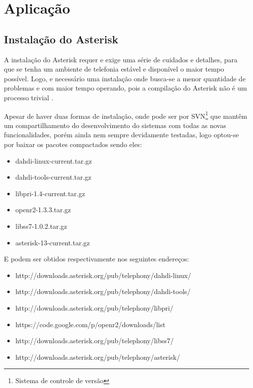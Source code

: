 
\chapter{Aplicação} %
\section{Instalação do Asterisk}
A instalação do Asterisk requer e exige uma série de cuidados e detalhes,  para que se tenha um ambiente de telefonia estável e disponível o maior tempo possível. Logo, e necessário uma instalação onde busca-se a menor quantidade de problemas e com maior tempo operando, pois a compilação do Asterisk não é um processo trivial \cite{alexandrekeller2014}.

Apesar de haver duas formas de instalação, onde pode ser por SVN\footnote{Sistema de controle de versão} que mantêm um compartilhamento do desenvolvimento do sistemas com todas as novas funcionalidades, porém ainda nem sempre devidamente testadas, logo optou-se por baixar os pacotes compactados sendo eles:

\begin{itemize}
  \item dahdi-linux-current.tar.gz
  \item dahdi-tools-current.tar.gz
  \item libpri-1.4-current.tar.gz
  \item openr2-1.3.3.tar.gz
  \item libss7-1.0.2.tar.gz
  \item asterisk-13-current.tar.gz
\end{itemize}

E podem ser obtidos respectivamente nos seguintes endereços:

\begin{itemize}
  \item http://downloads.asterisk.org/pub/telephony/dahdi-linux/
  \item http://downloads.asterisk.org/pub/telephony/dahdi-tools/
  \item http://downloads.asterisk.org/pub/telephony/libpri/
  \item https://code.google.com/p/openr2/downloads/list
  \item http://downloads.asterisk.org/pub/telephony/libss7/
  \item http://downloads.asterisk.org/pub/telephony/asterisk/
\end{itemize}

